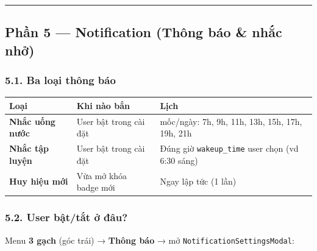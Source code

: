 \documentclass[12pt,a4paper]{article}
\begin{document}
\begin{center}\rule{0.5\linewidth}{0.5pt}\end{center}

\subsection{Phần 5 --- Notification (Thông báo \& nhắc
nhở)}\label{phux1ea7n-5-notification-thuxf4ng-buxe1o-nhux1eafc-nhux1edf}

\subsubsection{5.1. Ba loại thông
báo}\label{ba-loux1ea1i-thuxf4ng-buxe1o}

{\def\LTcaptype{none} %
\begin{longtable}[]{@{}
  >{\raggedright\arraybackslash}p{}
  >{\raggedright\arraybackslash}p{}
  >{\raggedright\arraybackslash}p{}@{}}
\toprule\noalign{}
\begin{minipage}[b]{\linewidth}\raggedright
Loại
\end{minipage} & \begin{minipage}[b]{\linewidth}\raggedright
Khi nào bắn
\end{minipage} & \begin{minipage}[b]{\linewidth}\raggedright
Lịch
\end{minipage} \\
\midrule\noalign{}
\endhead
\bottomrule\noalign{}
\endlastfoot
\textbf{Nhắc uống nước} & User bật trong cài đặt & 8 mốc/ngày: 7h, 9h,
11h, 13h, 15h, 17h, 19h, 21h \\
\textbf{Nhắc tập luyện} & User bật trong cài đặt & Đúng giờ
\texttt{wakeup\_time} user chọn (vd 6:30 sáng) \\
\textbf{Huy hiệu mới} & Vừa mở khóa badge mới & Ngay lập tức (1 lần) \\
\end{longtable}
}

\subsubsection{5.2. User bật/tắt ở
đâu?}\label{user-bux1eadttux1eaft-ux1edf-ux111uxe2u}

Menu \textbf{3 gạch} (góc trái) → \textbf{Thông báo} → mở
\texttt{NotificationSettingsModal}:
\end{document}
